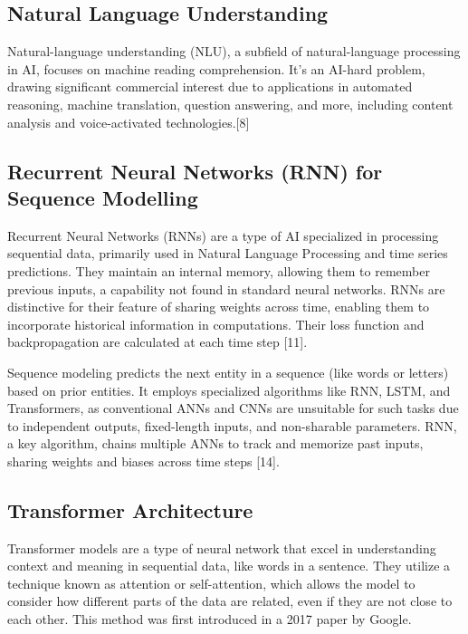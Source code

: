 \subsection{Natural Language Understanding}

Natural-language understanding (NLU), a subfield of natural-language processing in AI, focuses on machine reading comprehension. It's an AI-hard problem, drawing significant commercial interest due to applications in automated reasoning, machine translation, question answering, and more, including content analysis and voice-activated technologies.[8]



\subsection{Recurrent Neural Networks (RNN) for Sequence Modelling}

Recurrent Neural Networks (RNNs) are a type of AI specialized in processing sequential data, primarily used in Natural Language Processing and time series predictions. They maintain an internal memory, allowing them to remember previous inputs, a capability not found in standard neural networks. RNNs are distinctive for their feature of sharing weights across time, enabling them to incorporate historical information in computations. Their loss function and backpropagation are calculated at each time step [11].




Sequence modeling predicts the next entity in a sequence (like words or letters) based on prior entities. It employs specialized algorithms like RNN, LSTM, and Transformers, as conventional ANNs and CNNs are unsuitable for such tasks due to independent outputs, fixed-length inputs, and non-sharable parameters. RNN, a key algorithm, chains multiple ANNs to track and memorize past inputs, sharing weights and biases across time steps [14].



\subsection{Transformer Architecture}



Transformer models are a type of neural network that excel in understanding context and meaning in sequential data, like words in a sentence. They utilize a technique known as attention or self-attention, which allows the model to consider how different parts of the data are related, even if they are not close to each other. This method was first introduced in a 2017 paper by Google.

